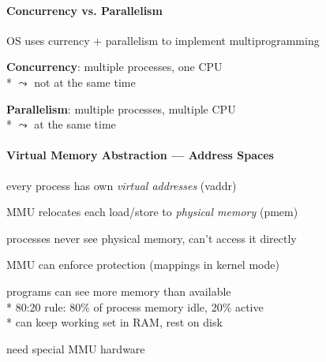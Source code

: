 \paragraph{Concurrency vs. Parallelism}
\begin{items}
	\item OS uses currency + parallelism to implement multiprogramming
	\begin{enumeration}
		\item \textbf{Concurrency}: multiple processes, one CPU \\* \( \leadsto \) not at the same time
		\item \textbf{Parallelism}: multiple processes, multiple CPU \\* \( \leadsto \) at the same time
	\end{enumeration}
\end{items}

\paragraph{Virtual Memory Abstraction --- Address Spaces}
\begin{items}
	\item every process has own \emph{virtual addresses} (vaddr)
	\item MMU relocates each load/store to \emph{physical memory} (pmem)
	\item processes never see physical memory, can't access it directly
	\item \textcolor{black!60!green}{\code{+}} MMU can enforce protection (mappings in kernel mode)
	\item \textcolor{black!60!green}{\code{+}} programs can see more memory than available \\*
		\phantom{x} 80:20 rule: 80\% of process memory idle, 20\% active \\*
		\phantom{x} can keep working set in RAM, rest on disk
	\item \textcolor{red}{\code{-}} need special MMU hardware
\end{items}

